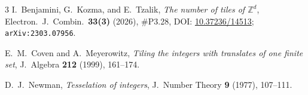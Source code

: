 \documentclass[11pt]{article}
\begin{document}
\begin{thebibliography}{3}
I.~Benjamini, G.~Kozma, and E.~Tzalik,
\emph{The number of tiles of $\mathbb{Z}^d$},
Electron.\ J.\ Combin.\ \textbf{33(3)} (2026), \#P3.28,
DOI: \href{https://doi.org/10.37236/14513}{10.37236/14513};
\texttt{arXiv:2303.07956}.

E.~M.~Coven and A.~Meyerowitz,
\emph{Tiling the integers with translates of one finite set},
J.\ Algebra \textbf{212} (1999), 161--174.

D.~J.~Newman,
\emph{Tesselation of integers},
J.\ Number Theory \textbf{9} (1977), 107--111.
\end{thebibliography}
\end{document}
